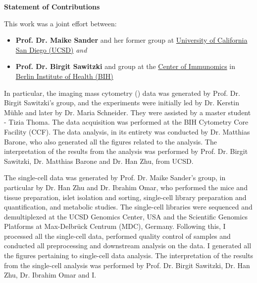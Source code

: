 \begin{Comment2}

\vspace{5mm}
\label{contr:chapter2}
\hspace{-3mm}
\textbf{\large Statement of Contributions} \\
\par This work was a joint effort between:
\begin{itemize}
  \item \textbf{Prof. Dr. Maike Sander} and her former group at \href{https://ucsd.edu/}{University of California San Diego (UCSD)} \textit{and}
  \item  \textbf{Prof. Dr. Birgit Sawitzki} and group at the \href{https://www.bihealth.org/de/forschung/sektionen/exploratory-diagnostic-sciences-eds/center-of-immunomics}{Center of Immunomics} in \href{https://www.bihealth.org/}{Berlin Institute of Health (BIH)}
\end{itemize}


\par In particular, the imaging mass cytometry () data was generated by Prof. Dr. Birgit Sawitzki's group, and the experiments were initially led by Dr. Kerstin Mühle and later by Dr. Maria Schneider. They were assisted by a master student - Tizia Thoma. The  data acquisition was performed at the BIH Cytometry Core Facility (CCF). The  data analysis, in its entirety was conducted by Dr. Matthias Barone, who also generated all the figures related to the  analysis. The interpretation of the results from the  analysis was performed by Prof. Dr. Birgit Sawitzki, Dr. Matthias Barone and Dr. Han Zhu, from UCSD.\\

\par The single-cell data was generated by Prof. Dr. Maike Sander's group, in particular by Dr. Han Zhu and Dr. Ibrahim Omar, who performed the mice and tissue preparation, islet isolation and sorting, single-cell library preparation and quantification, and metabolic studies. The single-cell libraries were sequenced and demultiplexed at the UCSD Genomics Center, USA and the Scientific Genomics Platforms at Max-Delbrück Centrum (MDC), Germany. Following this, I processed all the single-cell data, performed quality control of samples and conducted all preprocessing and downstream analysis on the data. I generated all the figures pertaining to single-cell data analysis. The interpretation of the results from the single-cell analysis was performed by Prof. Dr. Birgit Sawitzki, Dr. Han Zhu, Dr. Ibrahim Omar and I.\\


\end{Comment2}
